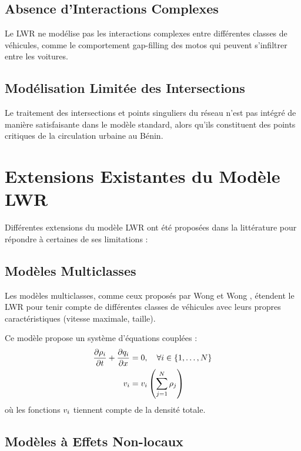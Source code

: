 \subsection{Absence d'Interactions Complexes}
\label{subsec:interactions}

Le LWR ne modélise pas les interactions complexes entre différentes classes de véhicules, comme le comportement gap-filling des motos qui peuvent s'infiltrer entre les voitures.

\subsection{Modélisation Limitée des Intersections}
\label{subsec:intersections}

Le traitement des intersections et points singuliers du réseau n'est pas intégré de manière satisfaisante dans le modèle standard, alors qu'ils constituent des points critiques de la circulation urbaine au Bénin.

\section{Extensions Existantes du Modèle LWR}
\label{sec:extensions_existantes}

Différentes extensions du modèle LWR ont été proposées dans la littérature pour répondre à certaines de ses limitations :

\subsection{Modèles Multiclasses}
\label{subsec:multiclasses}

Les modèles multiclasses, comme ceux proposés par Wong et Wong \cite{wong2002multi}, étendent le LWR pour tenir compte de différentes classes de véhicules avec leurs propres caractéristiques (vitesse maximale, taille).

\begin{example}
Ce modèle propose un système d'équations couplées :
\begin{align}
\frac{\partial \rho_{i}}{\partial t} + \frac{\partial q_{i}}{\partial x} &= 0, \quad \forall i \in \{1,\ldots,N\}\\
v_{i} &= v_{i}\left(\sum_{j=1}^{N} \rho_{j}\right)
\end{align}
où les fonctions $v_{i}$ tiennent compte de la densité totale.
\end{example}

\subsection{Modèles à Effets Non-locaux}
\label{subsec:non_local}

